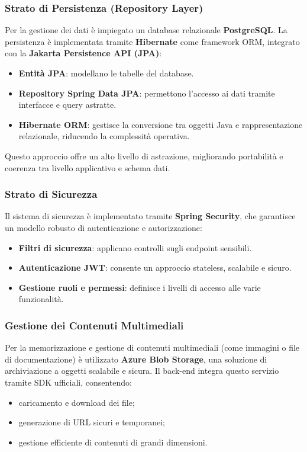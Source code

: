 \documentclass{book}
\begin{document}
\subsubsection{Strato di Persistenza (Repository Layer)}
Per la gestione dei dati è impiegato un database relazionale \textbf{PostgreSQL}. La persistenza è implementata tramite \textbf{Hibernate} come framework ORM, integrato con la \textbf{Jakarta Persistence API (JPA)}:
\begin{itemize}
    \item \textbf{Entità JPA}: modellano le tabelle del database.
    \item \textbf{Repository Spring Data JPA}: permettono l’accesso ai dati tramite interfacce e query astratte.
    \item \textbf{Hibernate ORM}: gestisce la conversione tra oggetti Java e rappresentazione relazionale, riducendo la complessità operativa.
\end{itemize}
Questo approccio offre un alto livello di astrazione, migliorando portabilità e coerenza tra livello applicativo e schema dati.

\subsubsection{Strato di Sicurezza}
Il sistema di sicurezza è implementato tramite \textbf{Spring Security}, che garantisce un modello robusto di autenticazione e autorizzazione:
\begin{itemize}
    \item \textbf{Filtri di sicurezza}: applicano controlli sugli endpoint sensibili.
    \item \textbf{Autenticazione JWT}: consente un approccio stateless, scalabile e sicuro.
    \item \textbf{Gestione ruoli e permessi}: definisce i livelli di accesso alle varie funzionalità.
\end{itemize}

\subsubsection{Gestione dei Contenuti Multimediali}
Per la memorizzazione e gestione di contenuti multimediali (come immagini o file di documentazione) è utilizzato \textbf{Azure Blob Storage}, una soluzione di archiviazione a oggetti scalabile e sicura. Il back-end integra questo servizio tramite SDK ufficiali, consentendo:
\begin{itemize}
    \item caricamento e download dei file;
    \item generazione di URL sicuri e temporanei;
    \item gestione efficiente di contenuti di grandi dimensioni.
\end{itemize}
\end{document}
